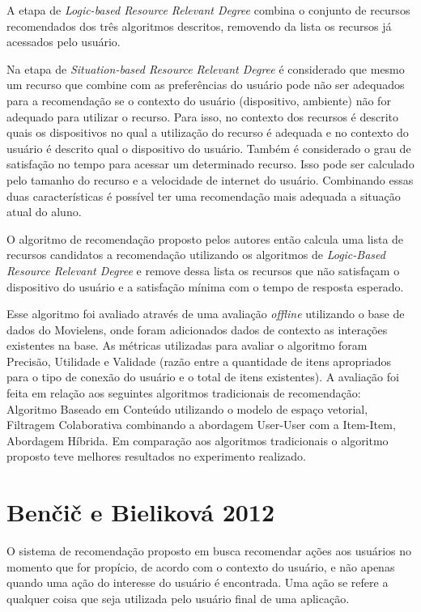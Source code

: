 A etapa de \textit{Logic-based Resource Relevant Degree} combina o conjunto de recursos recomendados dos três algoritmos
descritos, removendo da lista os recursos já acessados pelo usuário.

Na etapa de \textit{Situation-based Resource Relevant Degree} é considerado que mesmo um recurso que combine com as preferências
do usuário pode não ser adequados para a recomendação se o contexto do usuário (dispositivo, ambiente) não for adequado
para utilizar o recurso. Para isso, no contexto dos recursos é descrito quais os dispositivos no qual a utilização do
recurso é adequada e no contexto do usuário é descrito qual o dispositivo do usuário. Também é considerado o grau de
satisfação no tempo para acessar um determinado recurso. Isso pode ser calculado pelo tamanho do recurso e a velocidade
de internet do usuário. Combinando essas duas características é possível ter uma recomendação mais adequada a situação
atual do aluno.

O algoritmo de recomendação proposto pelos autores então calcula uma lista de recursos candidatos a recomendação
utilizando os algoritmos de \textit{Logic-Based Resource Relevant Degree} e remove dessa lista os recursos que não satisfaçam o
dispositivo do usuário e a satisfação mínima com o tempo de resposta esperado.

Esse algoritmo foi avaliado através de uma avaliação \textit{offline} utilizando o base de dados do Movielens, onde foram adicionados dados de
contexto as interações existentes na base. As métricas utilizadas para avaliar o algoritmo foram Precisão, Utilidade e
Validade (razão entre a quantidade de itens apropriados para o tipo de conexão do usuário e o total de itens existentes).
A avaliação foi feita em relação aos seguintes  algoritmos tradicionais de recomendação: Algoritmo Baseado em Conteúdo
utilizando o modelo de espaço vetorial, Filtragem Colaborativa combinando a abordagem User-User com a Item-Item, Abordagem
Híbrida. Em comparação aos algoritmos tradicionais o algoritmo proposto teve melhores resultados no
experimento realizado.

\section{Benčič e Bieliková 2012}

O sistema de recomendação proposto em  busca recomendar ações aos usuários no momento que
for propício, de acordo com o contexto do usuário, e não apenas quando uma ação do interesse do usuário é encontrada.
Uma ação se refere a qualquer coisa que seja utilizada pelo usuário final de uma aplicação.

